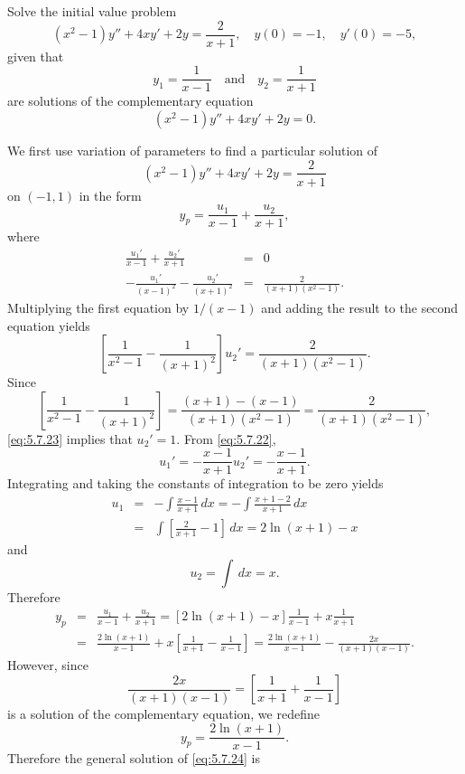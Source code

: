 \documentclass{ximera}
\begin{document}
 
\begin{example}\label{example:5.7.4}
Solve the initial value problem
\begin{equation} \label{eq:5.7.21}
(x^2-1)y''+4xy'+2y=\frac{2}{x+1}, \quad  y(0)=-1,\quad y'(0)=-5,
\end{equation}
 given that
$$
y_1=\frac{1}{x-1}\quad\mbox{and}\quad y_2=\frac{1}{x+1}
$$
are  solutions of the complementary
equation
$$
(x^2-1)y''+4xy'+2y=0.
$$
 
 
\begin{explanation}
We first use variation of parameters to find a particular solution
of
$$
(x^2-1)y''+4xy'+2y=\frac{2}{x+1}
$$
on $(-1,1)$ in the form
$$
y_p=\frac{u_1}{x-1}+\frac{u_2}{x+1},
$$
where
\begin{eqnarray}
\frac{u_1'}{x-1}+\frac{u_2'}{x+1}&=&0\label{eq:5.7.22}\\
-\frac{u_1'}{(x-1)^2}-\frac{u_2'}{(x+1)^2}&=&\frac{2}{(x+1)(x^2-1)}.\nonumber
\end{eqnarray}
Multiplying the first equation by $1/(x-1)$ and adding the result to
the second equation yields
\begin{equation} \label{eq:5.7.23}
\left[\frac{1}{x^2-1}-\frac{1}{(x+1)^2}\right]u_2'=\frac{2}{(x+1)(x^2-1)}.
\end{equation}
Since
$$
\left[\frac{1}{x^2-1}-\frac{1}{(x+1)^2}\right]=\frac{(x+1)-(x-1)}{(x+1)(x^2-1)}
=\frac{2}{(x+1)(x^2-1)},
$$
\eqref{eq:5.7.23} implies that $u_2'=1$. From \eqref{eq:5.7.22},
$$
u_1'=-\frac{x-1}{x+1}u_2'=-\frac{x-1}{x+1}.
$$
Integrating and taking the constants of integration to be zero yields
\begin{eqnarray*}
u_1&=&-\int\frac{x-1}{x+1}\,dx=-\int\frac{x+1-2}{x+1}\,dx \\
&=&\int\left[\frac{2}{x+1}-1\right]\,dx=2\ln(x+1)-x
\end{eqnarray*}
and
$$
u_2=\int\,dx=x.
$$
Therefore
\begin{eqnarray*}
y_p&=&\frac{u_1}{x-1}+\frac{u_2}{x+1}=\left[2\ln(x+1)-x\right]\frac{1}{x-1}
+x\frac{1}{x+1} \\
&=&\frac{2\ln(x+1)}{x-1}+x\left[\frac{1}{x+1}-\frac{1}{x-1}\right]
=\frac{2\ln(x+1)}{x-1}-\frac{2x}{(x+1)(x-1)}.
\end{eqnarray*}
However, since
$$
\frac{2x}{(x+1)(x-1)}=\left[\frac{1}{x+1}+\frac{1}{x-1}\right]
$$
is a solution of the complementary equation, we redefine
$$
y_p=\frac{2\ln(x+1)}{x-1}.
$$
Therefore  the general solution of  \eqref{eq:5.7.24} is
\begin{equation} \label{eq:5.7.24}

\end{equation}
\end{explanation}
\end{example}
\end{document}
